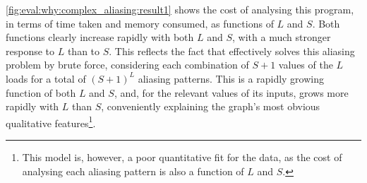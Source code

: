 \autoref{fig:eval:why:complex_aliasing:result1} shows the cost of
analysing this program, in terms of time taken and memory consumed, as
functions of $L$ and $S$.  Both functions clearly increase rapidly
with both $L$ and $S$, with a much stronger response to $L$ than to
$S$.  This reflects the fact that {\technique} effectively solves this
aliasing problem by brute force, considering each combination of $S+1$
values of the $L$ loads for a total of $(S+1)^L$ aliasing patterns.
This is a rapidly growing function of both $L$ and $S$, and, for the
relevant values of its inputs, grows more rapidly with $L$ than $S$,
conveniently explaining the graph's most obvious qualitative
features\footnote{This model is, however, a poor quantitative fit for
  the data, as the cost of analysing each aliasing pattern is also a
  function of $L$ and $S$.}\!\!.

